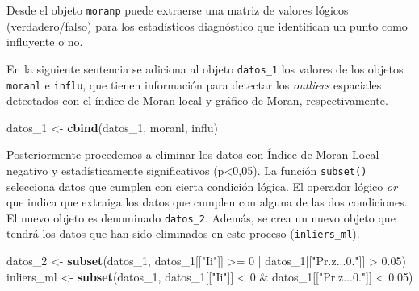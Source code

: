 \documentclass[11pt,b5paper,]{krantz}
\newenvironment{Shaded}{}{}
\newcommand{\CommentTok}[1]{\textcolor[rgb]{0.38,0.63,0.69}{\textit{#1}}}
\newcommand{\DecValTok}[1]{\textcolor[rgb]{0.25,0.63,0.44}{#1}}
\newcommand{\FloatTok}[1]{\textcolor[rgb]{0.25,0.63,0.44}{#1}}
\newcommand{\KeywordTok}[1]{\textcolor[rgb]{0.00,0.44,0.13}{\textbf{#1}}}
\newcommand{\NormalTok}[1]{#1}
\newcommand{\OperatorTok}[1]{\textcolor[rgb]{0.40,0.40,0.40}{#1}}
\newcommand{\StringTok}[1]{\textcolor[rgb]{0.25,0.44,0.63}{#1}}
\begin{document}
Desde el objeto \texttt{moranp} puede extraerse una matriz de valores lógicos (verdadero/falso) para los estadísticos diagnóstico que identifican un punto como influyente o no.

\begin{Shaded}
\end{Shaded}

En la siguiente sentencia se adiciona al objeto \texttt{datos\_1} los valores de los objetos \texttt{moranl} e \texttt{influ}, que tienen información para detectar los \emph{outliers} espaciales detectados con el índice de Moran local y gráfico de Moran, respectivamente.

\begin{Shaded}
\begin{Highlighting}[]
\NormalTok{datos_}\DecValTok{1}\NormalTok{ <-}\StringTok{ }\KeywordTok{cbind}\NormalTok{(datos_}\DecValTok{1}\NormalTok{, moranl, influ)}
\end{Highlighting}
\end{Shaded}

Posteriormente procedemos a eliminar los datos con Índice de Moran Local negativo y estadísticamente significativos (p\textless{}0,05). La función \texttt{subset()} selecciona datos que cumplen con cierta condición lógica. El operador lógico \emph{or} que indica que extraiga los datos que cumplen con alguna de las dos condiciones. El nuevo objeto es denominado \texttt{datos\_2}. Además, se crea un nuevo objeto que tendrá los datos que han sido eliminados en este proceso (\texttt{inliers\_ml}).

\begin{Shaded}
\begin{Highlighting}[]
\NormalTok{datos_}\DecValTok{2}\NormalTok{ <-}
\StringTok{  }\KeywordTok{subset}\NormalTok{(datos_}\DecValTok{1}\NormalTok{, }
\NormalTok{         datos_}\DecValTok{1}\NormalTok{[[}\StringTok{"Ii"}\NormalTok{]] }\OperatorTok{>=}\StringTok{ }\DecValTok{0} \OperatorTok{|}\StringTok{ }
\StringTok{           }\NormalTok{datos_}\DecValTok{1}\NormalTok{[[}\StringTok{"Pr.z...0."}\NormalTok{]] }\OperatorTok{>}\StringTok{ }\FloatTok{0.05}\NormalTok{)}
\NormalTok{inliers_ml <-}
\StringTok{  }\KeywordTok{subset}\NormalTok{(datos_}\DecValTok{1}\NormalTok{, }
\NormalTok{         datos_}\DecValTok{1}\NormalTok{[[}\StringTok{"Ii"}\NormalTok{]] }\OperatorTok{<}\StringTok{ }\DecValTok{0} \OperatorTok{&}
\StringTok{           }\NormalTok{datos_}\DecValTok{1}\NormalTok{[[}\StringTok{"Pr.z...0."}\NormalTok{]] }\OperatorTok{<}\StringTok{ }\FloatTok{0.05}\NormalTok{)}
\end{Highlighting}
\end{Shaded}
\end{document}
